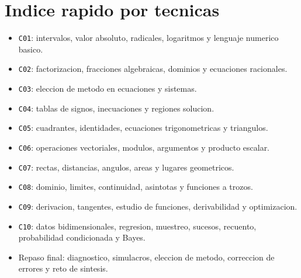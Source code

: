 \chapter*{Indice rapido por tecnicas}

\begin{itemize}[leftmargin=*]
  \item \texttt{C01}: intervalos, valor absoluto, radicales, logaritmos y lenguaje numerico
  basico.
  \item \texttt{C02}: factorizacion, fracciones algebraicas, dominios y ecuaciones racionales.
  \item \texttt{C03}: eleccion de metodo en ecuaciones y sistemas.
  \item \texttt{C04}: tablas de signos, inecuaciones y regiones solucion.
  \item \texttt{C05}: cuadrantes, identidades, ecuaciones trigonometricas y triangulos.
  \item \texttt{C06}: operaciones vectoriales, modulos, argumentos y producto escalar.
  \item \texttt{C07}: rectas, distancias, angulos, areas y lugares geometricos.
  \item \texttt{C08}: dominio, limites, continuidad, asintotas y funciones a trozos.
  \item \texttt{C09}: derivacion, tangentes, estudio de funciones, derivabilidad y optimizacion.
  \item \texttt{C10}: datos bidimensionales, regresion, muestreo, sucesos, recuento,
  probabilidad condicionada y Bayes.
  \item Repaso final: diagnostico, simulacros, eleccion de metodo, correccion de errores y reto
  de sintesis.
\end{itemize}
